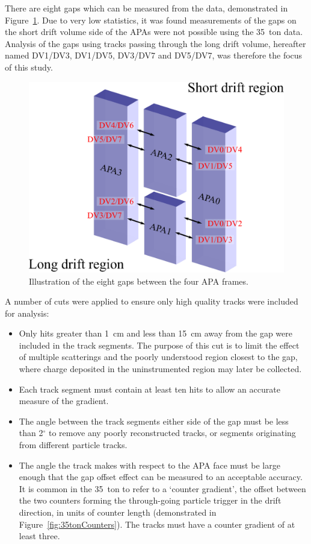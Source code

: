 There are eight gaps which can be measured from the data, demonstrated in Figure~\ref{fig:APAGapCrossingGaps}.  Due to very low statistics, it was found measurements of the gaps on the short drift volume side of the APAs were not possible using the 35~ton data.  Analysis of the gaps using tracks passing through the long drift volume, hereafter named DV1/DV3, DV1/DV5, DV3/DV7 and DV5/DV7, was therefore the focus of this study.

\begin{figure}
  \centering
  \includegraphics[width=12cm]{APAGapCrossingGaps.eps}
  \caption{Illustration of the eight gaps between the four APA frames.}
  \label{fig:APAGapCrossingGaps}
\end{figure}

A number of cuts were applied to ensure only high quality tracks were included for analysis:
\begin{itemize}
  \item{Only hits greater than 1~cm and less than 15~cm away from the gap were included in the track segments.  The purpose of this cut is to limit the effect of multiple scatterings and the poorly understood region closest to the gap, where charge deposited in the uninstrumented region may later be collected.}
  \item{Each track segment must contain at least ten hits to allow an accurate measure of the gradient.}
  \item{The angle between the track segments either side of the gap must be less than 2$^\circ$ to remove any poorly reconstructed tracks, or segments originating from different particle tracks.}
  \item{The angle the track makes with respect to the APA face must be large enough that the gap offset effect can be measured to an acceptable accuracy.  It is common in the 35~ton to refer to a `counter gradient', the offset between the two counters forming the through-going particle trigger in the drift direction, in units of counter length (demonstrated in Figure~\ref{fig:35tonCounters}).  The tracks must have a counter gradient of at least three.}
\end{itemize}


